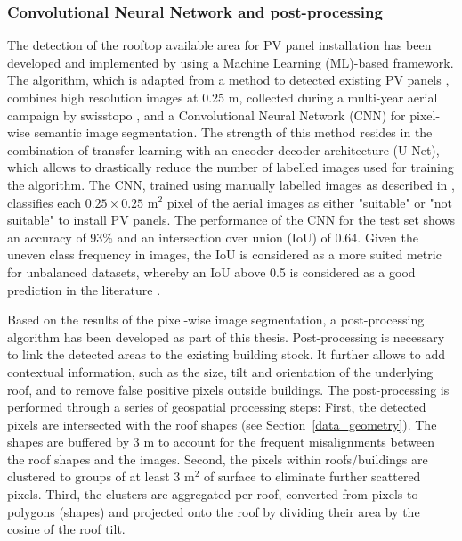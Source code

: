 \subsubsection{Convolutional Neural Network and post-processing}

The detection of the rooftop available area for PV panel installation has been developed and implemented by \citet{castello_quantification_2021} using a Machine Learning (ML)-based framework. 
The algorithm, which is adapted from a method to detected existing PV panels \cite{castello_deep_2019}, combines high resolution images at 0.25 m, collected during a multi-year aerial campaign by swisstopo \cite{swiss_federal_institue_of_topography_swisstopo_swissimage_nodate}, and a Convolutional Neural Network (CNN) for pixel-wise semantic image segmentation. The strength of this method resides in the combination of transfer learning with an encoder-decoder architecture (U-Net), which allows to drastically reduce the number of labelled images used for training the algorithm. 
The CNN, trained using manually labelled images as described in \cite{castello_quantification_2021}, classifies each $0.25 \times 0.25$ m$^2$ pixel of the aerial images as either "suitable" or "not suitable" to install PV panels. 
The performance of the CNN for the test set shows an accuracy of 93\% and an intersection over union (IoU) of 0.64. Given the uneven class frequency in images, the IoU is considered as a more suited metric for unbalanced datasets, whereby an IoU above 0.5 is considered as a good prediction in the literature \cite{castello_quantification_2021}.

Based on the results of the pixel-wise image segmentation, a post-processing algorithm has been developed as part of this thesis.
Post-processing is necessary to link the detected areas to the existing building stock. It further allows to add contextual information, such as the size, tilt and orientation of the underlying roof, and to remove false positive pixels outside buildings. The post-processing is performed through a series of geospatial processing steps: First, the detected pixels are intersected with the roof shapes (see Section~\ref{data_geometry}). The shapes are buffered by 3 m to account for the frequent misalignments between the roof shapes and the images. Second, the pixels within roofs/buildings are clustered to groups of at least 3 m$^2$ of surface to eliminate further scattered pixels. Third, the clusters are aggregated per roof, converted from pixels to polygons (shapes) and projected onto the roof by dividing their area by the cosine of the roof tilt.

